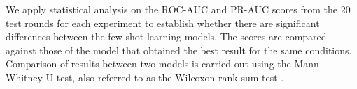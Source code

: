 We apply statistical analysis on the ROC-AUC and PR-AUC scores from the 20 test rounds for each experiment to establish whether there are significant differences between the few-shot learning models. The scores are compared against those of the model that obtained the best result for the same conditions. Comparison of results between two models is carried out using the Mann-Whitney U-test, also referred to as the Wilcoxon rank sum test \citep{mann1947test}.